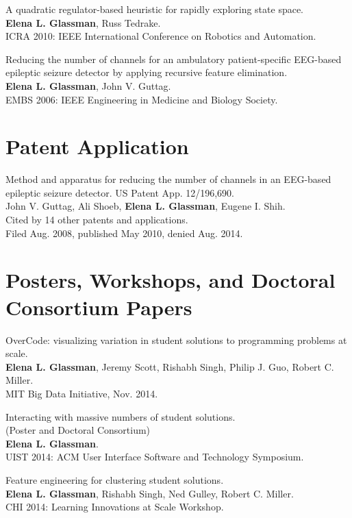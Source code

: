 \documentclass[margin]{res}
\begin{document}
\begin{resume}
A quadratic regulator-based heuristic for rapidly exploring state space.\\
{\bf Elena L. Glassman}, Russ Tedrake.\\
ICRA 2010: IEEE International Conference on Robotics and Automation. 

Reducing the number of channels for an ambulatory patient-specific EEG-based epileptic seizure detector by applying recursive feature elimination.\\
{\bf Elena L. Glassman}, John V. Guttag.\\
EMBS 2006: IEEE Engineering in Medicine and Biology Society.


\section{Patent Application}

Method and apparatus for reducing the number of channels in an EEG-based epileptic seizure detector. US Patent App. 12/196,690. \\
John V. Guttag, Ali Shoeb, {\bf Elena L. Glassman}, Eugene I. Shih.\\
Cited by 14 other patents and applications.\\
Filed Aug. 2008, published May 2010, denied Aug. 2014.

\newpage

\section{Posters, Workshops, and Doctoral Consortium Papers}

OverCode: visualizing variation in student solutions to programming problems at scale.\\
{\bf Elena L. Glassman}, Jeremy Scott, Rishabh Singh, Philip J. Guo, Robert C. Miller. \\ 
MIT Big Data Initiative, Nov. 2014.

Interacting with massive numbers of student solutions.\\ (Poster and Doctoral Consortium)\\
{\bf Elena L. Glassman}.\\ 
UIST 2014: ACM User Interface Software and Technology Symposium.

Feature engineering for clustering student solutions.\\
{\bf Elena L. Glassman}, Rishabh Singh, Ned Gulley, Robert C. Miller.\\
CHI 2014: Learning Innovations at Scale Workshop.


\end{resume}
\end{document}
